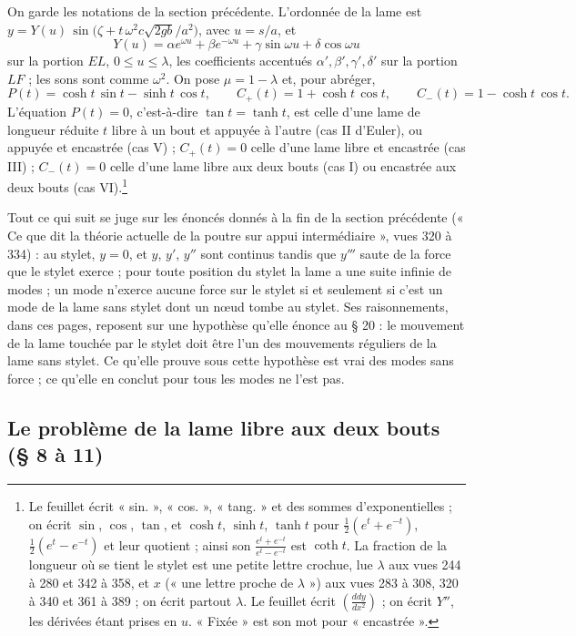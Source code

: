 \documentclass[11pt,a4paper]{article}
\begin{document}
On garde les notations de la section précédente. L'ordonnée de la lame est $y=Y(u)\,\sin\bigl(\zeta+t\,\omega^2c\sqrt{2gb}/a^2\bigr)$, avec $u=s/a$, et
\[
Y(u)=\alpha e^{\omega u}+\beta e^{-\omega u}+\gamma\sin\omega u+\delta\cos\omega u
\]
sur la portion $EL$, $0\le u\le\lambda$, les coefficients accentués $\alpha',\beta',\gamma',\delta'$ sur la portion $LF$ ; les sons sont comme $\omega^2$. On pose $\mu=1-\lambda$ et, pour abréger,
\[
P(t)=\cosh t\,\sin t-\sinh t\,\cos t,\qquad C_{+}(t)=1+\cosh t\,\cos t,\qquad C_{-}(t)=1-\cosh t\,\cos t .
\]
L'équation $P(t)=0$, c'est-à-dire $\tan t=\tanh t$, est celle d'une lame de longueur réduite $t$ libre à un bout et appuyée à l'autre (cas II d'Euler), ou appuyée et encastrée (cas V) ; $C_{+}(t)=0$ celle d'une lame libre et encastrée (cas III) ; $C_{-}(t)=0$ celle d'une lame libre aux deux bouts (cas I) ou encastrée aux deux bouts (cas VI).\footnote{Le feuillet écrit « sin. », « cos. », « tang. » et des sommes d'exponentielles ; on écrit $\sin$, $\cos$, $\tan$, et $\cosh t$, $\sinh t$, $\tanh t$ pour $\frac12(e^t+e^{-t})$, $\frac12(e^t-e^{-t})$ et leur quotient ; ainsi son $\frac{e^{t}+e^{-t}}{e^{t}-e^{-t}}$ est $\coth t$. La fraction de la longueur où se tient le stylet est une petite lettre crochue, lue $\lambda$ aux vues 244 à 280 et 342 à 358, et $x$ (« une lettre proche de $\lambda$ ») aux vues 283 à 308, 320 à 340 et 361 à 389 ; on écrit partout $\lambda$. Le feuillet écrit $\left(\frac{ddy}{dx^2}\right)$ ; on écrit $Y''$, les dérivées étant prises en $u$. « Fixée » est son mot pour « encastrée ».}

Tout ce qui suit se juge sur les énoncés donnés à la fin de la section précédente (« Ce que dit la théorie actuelle de la poutre sur appui intermédiaire », vues 320 à 334) : au stylet, $y=0$, et $y$, $y'$, $y''$ sont continus tandis que $y'''$ saute de la force que le stylet exerce ; pour toute position du stylet la lame a une suite infinie de modes ; un mode n'exerce aucune force sur le stylet si et seulement si c'est un mode de la lame sans stylet dont un nœud tombe au stylet. Ses raisonnements, dans ces pages, reposent sur une hypothèse qu'elle énonce au § 20 : le mouvement de la lame touchée par le stylet doit être l'un des mouvements réguliers de la lame sans stylet. Ce qu'elle prouve sous cette hypothèse est vrai des modes sans force ; ce qu'elle en conclut pour tous les modes ne l'est pas.

\subsection*{Le problème de la lame libre aux deux bouts (§ 8 à 11)}
\end{document}
